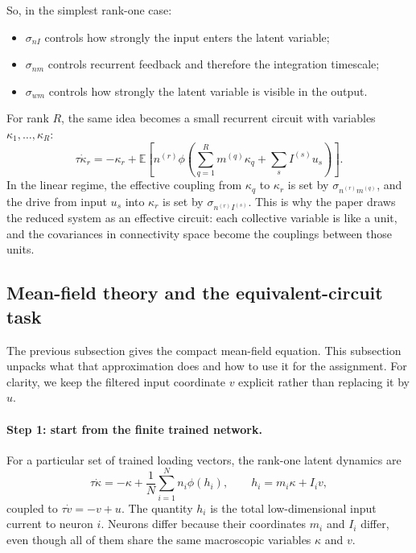 \documentclass[11pt]{article}
\begin{document}
So, in the simplest rank-one case:
\begin{itemize}
  \item $\sigma_{nI}$ controls how strongly the input enters the latent variable;
  \item $\sigma_{nm}$ controls recurrent feedback and therefore the integration
  timescale;
  \item $\sigma_{wm}$ controls how strongly the latent variable is visible in
  the output.
\end{itemize}

For rank $R$, the same idea becomes a small recurrent circuit with variables
$\kappa_1,\ldots,\kappa_R$:
\begin{equation}
  \tau \dot{\kappa}_r
  =
  -\kappa_r
  +
  \mathbb{E}
  \left[
    n^{(r)}
    \phi\!\left(
      \sum_{q=1}^{R}m^{(q)}\kappa_q
      +
      \sum_s I^{(s)}u_s
    \right)
  \right].
  \label{eq:rank_R_mean_field_expectation}
\end{equation}
In the linear regime, the effective coupling from $\kappa_q$ to $\kappa_r$ is
set by $\sigma_{n^{(r)}m^{(q)}}$, and the drive from input $u_s$ into
$\kappa_r$ is set by $\sigma_{n^{(r)}I^{(s)}}$. This is why the paper draws the
reduced system as an effective circuit: each collective variable is like a unit,
and the covariances in connectivity space become the couplings between those
units.

\subsection{Mean-field theory and the equivalent-circuit task}

The previous subsection gives the compact mean-field equation. This subsection
unpacks what that approximation does and how to use it for the assignment. For
clarity, we keep the filtered input coordinate $v$ explicit rather than replacing
it by $u$.

\paragraph{Step 1: start from the finite trained network.}
For a particular set of trained loading vectors, the rank-one latent dynamics are
\begin{equation}
  \tau\dot\kappa
  =
  -\kappa
  +
  \frac{1}{N}\sum_{i=1}^{N}
  n_i\phi(h_i),
  \qquad
  h_i=m_i\kappa+I_i v,
  \label{eq:mf_task_finite}
\end{equation}
coupled to $\tau\dot v=-v+u$. The quantity $h_i$ is the total low-dimensional
input current to neuron $i$. Neurons differ because their coordinates $m_i$ and
$I_i$ differ, even though all of them share the same macroscopic variables
$\kappa$ and $v$.
\end{document}
